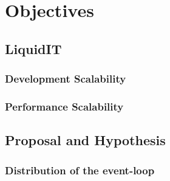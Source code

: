 \section{Objectives}

\subsection{LiquidIT}

\subsubsection{Development Scalability}

\subsubsection{Performance Scalability}

\subsection{Proposal and Hypothesis}

\subsubsection{Distribution of the event-loop}

\subsubsection{}